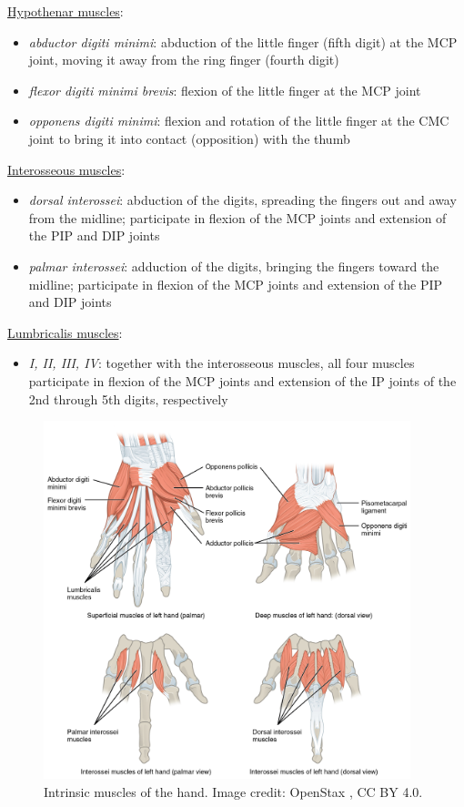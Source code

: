 \documentclass[12pt]{article}
\begin{document}
\underline{Hypothenar muscles}: 
\begin{itemize}
    \item \textit{abductor digiti minimi}: abduction of the little finger (fifth digit) at the MCP joint, moving it away from the ring finger (fourth digit)
    \item \textit{flexor digiti minimi brevis}: flexion of the little finger at the MCP joint
    \item \textit{opponens digiti minimi}: flexion and rotation of the little finger at the CMC joint to bring it into contact (opposition) with the thumb
\end{itemize}   

\underline{Interosseous muscles}: 
\begin{itemize}
    \item \textit{dorsal interossei}: abduction of the digits, spreading the fingers out and away from the midline; participate in flexion of the MCP joints and extension of the PIP and DIP joints 
    \item \textit{palmar interossei}: adduction of the digits, bringing the fingers toward the midline; participate in flexion of the MCP joints and extension of the PIP and DIP joints 
\end{itemize}

\underline{Lumbricalis muscles}:
\begin{itemize}
    \item \textit{I, II, III, IV}: together with the interosseous muscles, all four muscles participate in flexion of the MCP joints and extension of the IP joints of the 2nd through 5th digits, respectively 
\end{itemize}

\begin{figure}[h!]
\centering
\includegraphics[width=0.95\textwidth]{images/Intrinsic_Muscles_of_the_Hand.jpg}
\caption{Intrinsic muscles of the hand. Image credit: OpenStax \citep{openStaxMuscles}, CC BY 4.0.}
\label{fig:intMuscles}
\end{figure}
\end{document}
